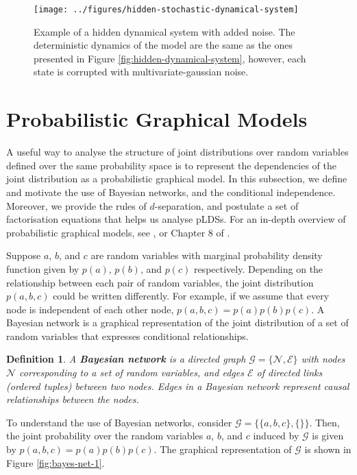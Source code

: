 \documentclass[12pt, oneside]{book}
\numberwithin{equation}{section}
\newtheorem{definition}{Definition}[section]
\begin{document}
{\begin{figure}[h!]
	\centering
	\texttt{[image: ../figures/hidden-stochastic-dynamical-system]}
	\caption{Example of a hidden dynamical system with added noise. The deterministic dynamics of the model are the same as the ones presented in Figure \ref{fig:hidden-dynamical-system}, however, each state is corrupted with multivariate-gaussian noise.}
	\label{fig:hidden-noisy-dynamical-system}
\end{figure}


\section{Probabilistic Graphical Models}
A useful way to analyse the structure of joint distributions over random variables defined over the same probability space is to represent the dependencies of the joint distribution as a probabilistic graphical model. In this subsection, we define and motivate the use of Bayesian networks, and the conditional independence. Moreover, we provide the rules of $d$-separation, and postulate a set of factorisation equations that helps us analyse pLDSs. For an in-depth overview of probabilistic graphical models, see \cite{koller2009}, or Chapter 8 of \cite{prml}.

Suppose $a$, $b$, and $c$ are random variables with marginal probability density function given by $p(a)$, $p(b)$, and $p(c)$ respectively. Depending on the relationship between each pair of random variables, the joint distribution $p(a,b,c)$ could be written differently. For example, if we assume that every node is independent of each other node, $p(a,b,c) = p(a) p(b) p(c)$. A Bayesian network is a graphical representation of the joint distribution of a set of random variables that expresses conditional relationships.

\begin{definition}
	A \textbf{Bayesian network} is a directed graph $\mathcal G = \{\mathscr{N}, \mathscr{E}\}$ with nodes $\mathscr{N}$ corresponding to a set of random variables, and edges $\mathscr{E}$ of directed links (ordered tuples) between two nodes. Edges in a Bayesian network represent causal relationships between the nodes.
\end{definition}

To understand the use of Bayesian networks, consider $\mathcal G = \{\{a, b, c\}, \{\}\}$. Then, the joint probability over the random variables $a$, $b$, and $c$ induced by $\mathcal G$ is given by $p(a,b,c) = p(a) p(b) p(c)$. The graphical representation of $\mathcal G$ is shown in Figure \ref{fig:bayes-net-1}.

}
\end{document}
